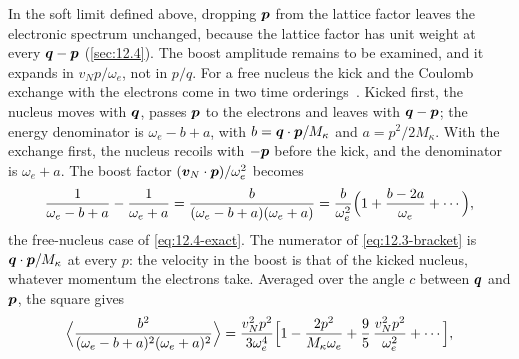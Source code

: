 In the soft limit defined above, dropping $\bm{p}$ from the lattice factor leaves the electronic spectrum unchanged, because the lattice factor has unit weight at every $\bm{q} - \bm{p}$ (\cref{sec:12.4}). The boost amplitude remains to be examined, and it expands in $v_Np/\omega_e$, not in $p/q$. For a free nucleus the kick and the Coulomb exchange with the electrons come in two time orderings~\cite[Eq.~(1)]{liang2021describing}. Kicked first, the nucleus moves with $\bm{q}$, passes $\bm{p}$ to the electrons and leaves with $\bm{q} - \bm{p}$; the energy denominator is $\omega_e - b + a$, with $b = \bm{q}\cdot\bm{p}/M_\kappa$ and $a = p^2/2M_\kappa$. With the exchange first, the nucleus recoils with $-\bm{p}$ before the kick, and the denominator is $\omega_e + a$. The boost factor $(\bm{v}_N\cdot\bm{p})/\omega_e^2$ becomes
\begin{equation}
  \frac{1}{\omega_e - b + a} - \frac{1}{\omega_e + a} = \frac{b}{(\omega_e - b + a)(\omega_e + a)} = \frac{b}{\omega_e^2}\Bigl(1 + \frac{b - 2a}{\omega_e} + \cdots\Bigr) ,
  \label{eq:12.3-bracket}
\end{equation}
the free-nucleus case of \cref{eq:12.4-exact}. The numerator of \cref{eq:12.3-bracket} is $\bm{q}\cdot\bm{p}/M_\kappa$ at every $p$: the velocity in the boost is that of the kicked nucleus, whatever momentum the electrons take. Averaged over the angle $c$ between $\bm{q}$ and $\bm{p}$, the square gives
\begin{equation*}
  \Bigl\langle\frac{b^2}{(\omega_e - b + a)^2(\omega_e + a)^2}\Bigr\rangle = \frac{v_N^2p^2}{3\omega_e^4}\Bigl[1 - \frac{2p^2}{M_\kappa\omega_e} + \frac95\,\frac{v_N^2p^2}{\omega_e^2} + \cdots\Bigr] ,
\end{equation*}
